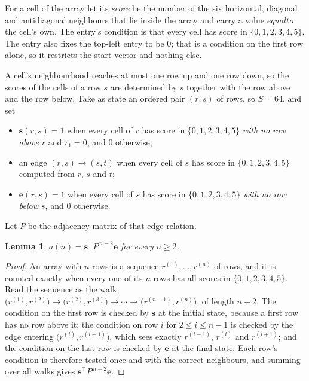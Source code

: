 \documentclass[11pt,a4paper]{article}
\theoremstyle{plain}
\newtheorem{lemma}[theorem]{Lemma}
\theoremstyle{definition}
\begin{document}
For a cell of the array let its \emph{score} be the number of the six horizontal, diagonal and antidiagonal neighbours that lie inside
the array and carry a value $equal to$ the cell's own. The entry's condition is that every cell
has score in $\{0,1,2,3,4,5\}$. The entry also fixes the top-left entry to be $0$; that is a condition on the first row alone, so it restricts the start vector and nothing else.

A cell's neighbourhood reaches at most one row up and one row down, so the scores of the
cells of a row $s$ are determined by $s$ together with the row above and the row below.
Take as state an ordered pair $(r,s)$ of rows, so $S=64$, and set
\begin{itemize}
\item $\mathbf{s}(r,s)=1$ when every cell of $r$ has score in $\{0,1,2,3,4,5\}$ \emph{with no row
above $r$} and $r_1=0$, and $0$ otherwise;
\item an edge $(r,s)\to(s,t)$ when every cell of $s$ has score in $\{0,1,2,3,4,5\}$ computed from
$r$, $s$ and $t$;
\item $\mathbf{e}(r,s)=1$ when every cell of $s$ has score in $\{0,1,2,3,4,5\}$ \emph{with no row
below $s$}, and $0$ otherwise.
\end{itemize}
Let $P$ be the adjacency matrix of that edge relation.

\begin{lemma}\label{lem:walk}
$a(n)=\mathbf{s}^{\!\top}P^{\,n-2}\mathbf{e}$ for every $n\ge2$.
\end{lemma}

\begin{proof}
An array with $n$ rows is a sequence $r^{(1)},\dots,r^{(n)}$ of rows, and it is counted
exactly when every one of its $n$ rows has all scores in $\{0,1,2,3,4,5\}$. Read the sequence as the
walk $\bigl(r^{(1)},r^{(2)}\bigr)\to\bigl(r^{(2)},r^{(3)}\bigr)\to\cdots\to
\bigl(r^{(n-1)},r^{(n)}\bigr)$, of length $n-2$. The condition on the first row is
checked by $\mathbf{s}$ at the initial state, because a first row has no row above it; the
condition on row $i$ for $2\le i\le n-1$ is checked by the edge entering
$\bigl(r^{(i)},r^{(i+1)}\bigr)$, which sees exactly $r^{(i-1)}$, $r^{(i)}$ and
$r^{(i+1)}$; and the condition on the last row is checked by $\mathbf{e}$ at the final
state. Each row's condition is therefore tested once and with the correct neighbours, and
summing over all walks gives $\mathbf{s}^{\!\top}P^{\,n-2}\mathbf{e}$.
\end{proof}
\end{document}
